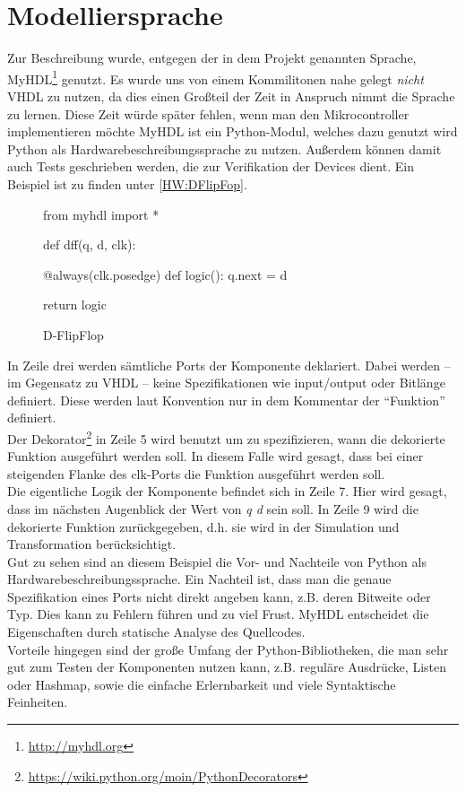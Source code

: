 \section{Modelliersprache}
Zur Beschreibung wurde, entgegen der in dem Projekt genannten Sprache, MyHDL\footnote{\url{http://myhdl.org}} genutzt. Es wurde uns von einem Kommilitonen nahe gelegt \textit{nicht} VHDL zu nutzen, da dies einen Großteil der Zeit in Anspruch nimmt die Sprache zu lernen. Diese Zeit würde später fehlen, wenn man den Mikrocontroller implementieren möchte
MyHDL ist ein Python-Modul, welches dazu genutzt wird Python als Hardwarebeschreibungssprache zu nutzen. Außerdem können damit auch Tests geschrieben werden, die zur Verifikation der Devices dient.
Ein Beispiel ist zu finden unter \autoref{HW:DFlipFop}.

\begin{figure}[h]
\small
\begin{pythoncode}
from myhdl import *
 
def dff(q, d, clk):
 
    @always(clk.posedge)
    def logic():
        q.next = d
 
    return logic
\end{pythoncode}
\caption{\label{HW:DFlipFop}D-FlipFlop}
\end{figure}

In Zeile drei werden sämtliche Ports der Komponente deklariert. Dabei werden -- im Gegensatz zu VHDL -- keine Spezifikationen wie input/output oder Bitlänge definiert. Diese werden laut Konvention nur in dem Kommentar der ``Funktion'' definiert.\\
Der Dekorator\footnote{\url{https://wiki.python.org/moin/PythonDecorators}} in Zeile 5 wird benutzt um zu spezifizieren, wann die dekorierte Funktion ausgeführt werden soll. In diesem Falle wird gesagt, dass bei einer steigenden Flanke des clk-Ports die Funktion ausgeführt werden soll.\\
Die eigentliche Logik der Komponente befindet sich in Zeile 7. Hier wird gesagt, dass im nächsten Augenblick der Wert von \textit{q d} sein soll.
In Zeile 9 wird die dekorierte Funktion zurückgegeben, d.h. sie wird in der Simulation und Transformation berücksichtigt.\\
Gut zu sehen sind an diesem Beispiel die Vor- und Nachteile von Python als Hardwarebeschreibungssprache. Ein Nachteil ist, dass man die genaue Spezifikation eines Ports nicht direkt angeben kann, z.B. deren Bitweite oder Typ. Dies kann zu Fehlern führen und zu viel Frust. MyHDL entscheidet die Eigenschaften durch statische Analyse des Quellcodes.\\
Vorteile hingegen sind der große Umfang der Python-Bibliotheken, die man sehr gut zum Testen der Komponenten nutzen kann, z.B. reguläre Ausdrücke, Listen oder Hashmap, sowie die einfache Erlernbarkeit und viele Syntaktische Feinheiten.\\

